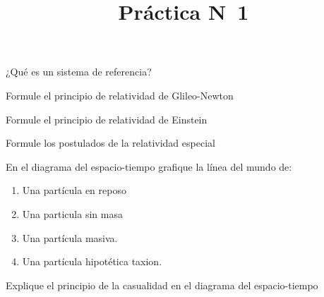 \documentclass[12pt,a4paper]{practice}
\begin{document}
    \title{Práctica N\textdegree\ 1}
    \maketitle

    \begin{problem}\label{prob:1}
        ¿Qué es un sistema de referencia?
    \end{problem}

    \begin{problem}\label{prob:2}
        Formule el principio de relatividad de Glileo-Newton
    \end{problem}

    \begin{problem}\label{prob:3}
        Formule el principio de relatividad de Einstein
    \end{problem}
    
    \begin{problem}\label{prob:4}
        Formule los postulados de la relatividad especial    
    \end{problem}
    
    \begin{problem}\label{prob:5}
        En el diagrama del espacio-tiempo grafique la línea del mundo de:
        \begin{enumerate}[label=(\alph*)]
                \item Una partícula en reposo
                \item Una particula sin masa
                \item Una partícula masiva.
                \item Una partícula hipotética taxion.
        \end{enumerate}    
    \end{problem}

    \begin{problem}\label{prob:6}
        Explique el principio de la casualidad en el diagrama del espacio-tiempo    
    \end{problem}
\end{document}
